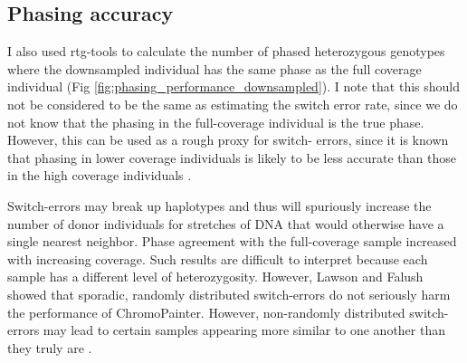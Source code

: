 {\subsection{Phasing accuracy}

I also used rtg-tools to calculate the number of phased heterozygous genotypes where the downsampled individual has the same phase as the full coverage individual (Fig \ref{fig:phasing_performance_downsampled}). I note that this should not be considered to be the same as estimating the switch error rate, since we do not know that the phasing in the full-coverage individual is the true phase. However, this can be used as a rough proxy for switch- errors, since it is known that phasing in lower coverage individuals is likely to be less accurate than those in the high coverage individuals \cite{rubinacci2021efficient}.



Switch-errors may break up haplotypes and thus will spuriously increase the number of donor individuals for stretches of DNA that would otherwise have a single nearest neighbor. Phase agreement with the full-coverage sample increased with increasing coverage. Such results are difficult to interpret because each sample has a different level of heterozygosity. However, Lawson and Falush showed that sporadic, randomly distributed switch-errors do not seriously harm the performance of ChromoPainter. However, non-randomly distributed switch-errors may lead to certain samples appearing more similar to one another than they truly are \cite{LawsonFalushReview}.

}
